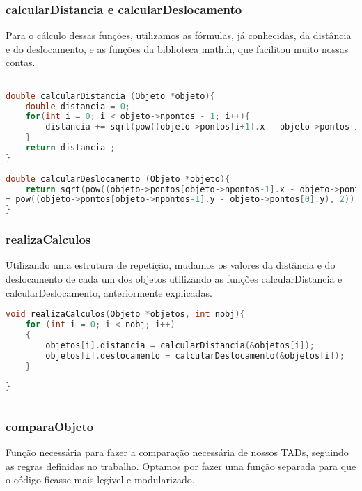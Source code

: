 \documentclass{article}
\begin{document}
\subsubsection{calcularDistancia e calcularDeslocamento}

Para o cálculo dessas funções, utilizamos as fórmulas, já conhecidas, da distância e do deslocamento, e as funções da biblioteca math.h, que facilitou muito nossas contas.

\begin{lstlisting}[caption={Funções calcularDistancia e calcularDeslocamento},label={lst:cod6},language=C]

double calcularDistancia (Objeto *objeto){
    double distancia = 0;
    for(int i = 0; i < objeto->npontos - 1; i++){
        distancia += sqrt(pow((objeto->pontos[i+1].x - objeto->pontos[i].x), 2) + pow((objeto->pontos[i+1].y - objeto->pontos[i].y), 2));
    }
    return distancia ;
}
    
double calcularDeslocamento (Objeto *objeto){
    return sqrt(pow((objeto->pontos[objeto->npontos-1].x - objeto->pontos[0].x), 2) 
+ pow((objeto->pontos[objeto->npontos-1].y - objeto->pontos[0].y), 2));
}

\end{lstlisting}


\subsubsection{realizaCalculos}

Utilizando uma estrutura de repetição, mudamos os valores da distância e do deslocamento de cada um dos objetos utilizando as funções calcularDistancia e calcularDeslocamento, anteriormente explicadas.

\begin{lstlisting}[caption={Função realizaCalculos},label={lst:cod7},language=C]
void realizaCalculos(Objeto *objetos, int nobj){
    for (int i = 0; i < nobj; i++)
    {
        objetos[i].distancia = calcularDistancia(&objetos[i]);
        objetos[i].deslocamento = calcularDeslocamento(&objetos[i]);
    }
   
}
    
\end{lstlisting}

\subsubsection{comparaObjeto}

Função necessária para fazer a comparação necessária de nossos TADs, seguindo as regras
definidas no trabalho. Optamos por fazer uma função separada 
para que o código ficasse mais legível e modularizado. 
\end{document}
